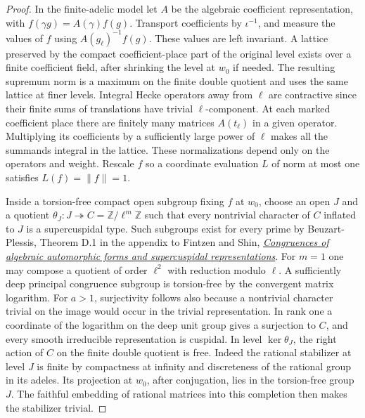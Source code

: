 \begin{proof}
In the finite-adelic model let \(A\) be the algebraic coefficient
representation, with \(f(\gamma g)=A(\gamma)f(g)\). Transport coefficients
by \(\iota^{-1}\), and measure the values of \(f\) using
\(A(g_\ell)^{-1}f(g)\). These values are left invariant. A lattice
preserved by the compact coefficient-place part of the original level
exists over a finite coefficient field, after shrinking the level at
\(w_0\) if needed. The resulting supremum norm is a maximum on the
finite double quotient and uses the same lattice at finer levels.
Integral Hecke operators away from \(\ell\) are contractive since their
finite sums of translations have trivial \(\ell\)-component. At each
marked coefficient place there are finitely many matrices \(A(t_\ell)\)
in a given operator. Multiplying its coefficients by a sufficiently
large power of \(\ell\) makes all the summands integral in the lattice.
These normalizations depend only on the operators and weight.
Rescale \(f\) so a coordinate evaluation \(L\) of norm at most one
satisfies \(L(f)=\|f\|=1\).

Inside a torsion-free compact open subgroup fixing \(f\) at \(w_0\),
choose an open \(J\) and a quotient
\(\theta_J:J\twoheadrightarrow C=\mathbb Z/\ell^m\mathbb Z\) such
that every nontrivial character of \(C\) inflated to \(J\) is a
supercuspidal type. Such subgroups exist for every prime by
Beuzart-Plessis, Theorem D.1 in the appendix to Fintzen and Shin,
\href{https://arxiv.org/abs/2009.08476}{\emph{Congruences of algebraic automorphic forms and supercuspidal representations}}.
For \(m=1\) one may compose a quotient of order \(\ell^2\)
with reduction modulo \(\ell\).
A sufficiently deep principal congruence subgroup is torsion-free by
the convergent matrix logarithm. For \(a>1\), surjectivity follows also
because a nontrivial character trivial on the image would occur in
the trivial representation. In rank one a coordinate of the logarithm
on the deep unit group gives a surjection to \(C\), and every smooth
irreducible representation is cuspidal. In level \(\ker\theta_J\), the right
action of \(C\) on the finite double quotient is free. Indeed the
rational stabilizer at level \(J\) is finite by compactness at infinity
and discreteness of the rational group in its adeles. Its projection
at \(w_0\), after conjugation, lies in the torsion-free group \(J\).
The faithful embedding of rational matrices into this completion
then makes the stabilizer trivial.


\end{proof}
